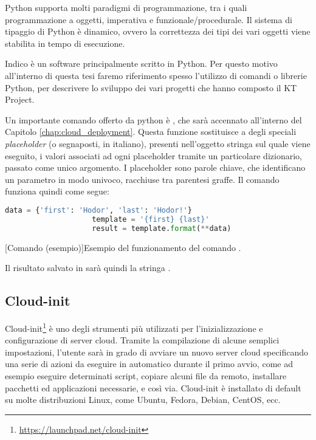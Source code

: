         	Python supporta molti paradigmi di programmazione, tra i quali programmazione a oggetti, imperativa e funzionale/procedurale. Il sistema di tipaggio di Python è dinamico, ovvero la correttezza dei tipi dei vari oggetti viene stabilita in tempo di esecuzione.
        	
        	Indico è un software principalmente scritto in Python. Per questo motivo all'interno di questa tesi faremo riferimento spesso l'utilizzo di comandi o librerie Python, per descrivere lo sviluppo dei vari progetti che hanno composto il KT Project.
        
            Un importante comando offerto da python è , che sarà accennato all'interno del Capitolo \ref{chap:cloud_deployment}. Questa funzione sostituisce a degli speciali \textit{placeholder} (o segnaposti, in italiano), presenti nell'oggetto stringa sul quale viene eseguito, i valori associati ad ogni placeholder tramite un particolare dizionario, passato come unico argomento. I placeholder sono parole chiave, che identificano un parametro in modo univoco, racchiuse tra parentesi graffe. Il comando  funziona quindi come segue:
            
            \begin{center}
                \begin{lstlisting}[language=python, gobble=18]
                    data = {'first': 'Hodor', 'last': 'Hodor!'}
                    template = '{first} {last}'
                    result = template.format(**data)
                \end{lstlisting}
                \captionsetup{textformat=empty,labelformat=empty} \vspace{-2em}
                [Comando  (esempio)]{Esempio del funzionamento del comando .}
            \end{center}
            
            Il risultato salvato in  sarà quindi la stringa .
        
        \subsection{Cloud-init} \label{subsec:p;sl;cloud-init}
        
            Cloud-init\footnote{\url{https://launchpad.net/cloud-init}} è uno degli strumenti più utilizzati per l'inizializzazione e configurazione di server cloud. Tramite la compilazione di alcune semplici impostazioni, l'utente sarà in grado di avviare un nuovo server cloud specificando una serie di azioni da eseguire in automatico durante il primo avvio, come ad esempio eseguire determinati script, copiare alcuni file da remoto, installare pacchetti ed applicazioni necessarie, e così via. Cloud-init è installato di default su molte distribuzioni Linux, come Ubuntu, Fedora, Debian, CentOS, ecc. \cite{cloud-init:readthedocs}
            
